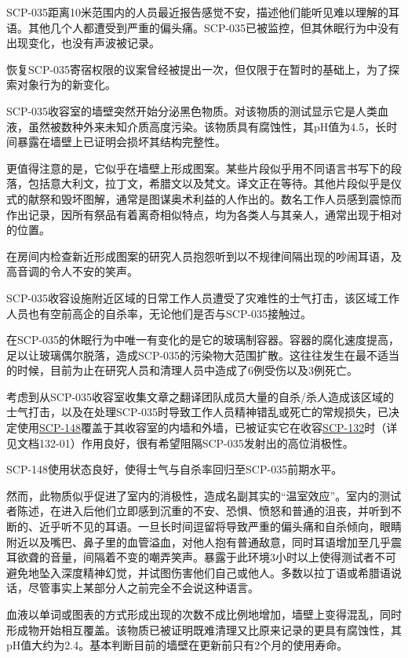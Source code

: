 SCP-035距离10米范围内的人员最近报告感觉不安，描述他们能听见难以理解的耳语。其他几个人都遭受到严重的偏头痛。SCP-035已被监控，但其休眠行为中没有出现变化，也没有声波被记录。

恢复SCP-035寄宿权限的议案曾经被提出一次，但仅限于在暂时的基础上，为了探索对象行为的新变化。

SCP-035收容室的墙壁突然开始分泌黑色物质。对该物质的测试显示它是人类血液，虽然被数种外来未知介质高度污染。该物质具有腐蚀性，其pH值为4.5，长时间暴露在墙壁上已证明会损坏其结构完整性。

更值得注意的是，它似乎在墙壁上形成图案。某些片段似乎用不同语言书写下的段落，包括意大利文，拉丁文，希腊文以及梵文。译文正在等待。其他片段似乎是仪式的献祭和毁坏图解，通常是图谋奥术利益的人作出的。数名工作人员感到震惊而作出记录，因所有祭品有着离奇相似特点，均为各类人与其亲人，通常出现于相对的位置。

在房间内检查新近形成图案的研究人员抱怨听到以不规律间隔出现的吵闹耳语，及高音调的令人不安的笑声。

SCP-035收容设施附近区域的日常工作人员遭受了灾难性的士气打击，该区域工作人员也有空前高企的自杀率，无论他们是否与SCP-035接触过。

在SCP-035的休眠行为中唯一有变化的是它的玻璃制容器。容器的腐化速度提高，足以让玻璃偶尔脱落，造成SCP-035的污染物大范围扩散。这往往发生在最不适当的时候，目前为止在研究人员和清理人员中造成了6例受伤以及3例死亡。

考虑到从SCP-035收容室收集文章之翻译团队成员大量的自杀\slash 杀人造成该区域的士气打击，以及在处理SCP-035时导致工作人员精神错乱或死亡的常规损失，已决定使用\hyperref[chap:SCP-148]{SCP-148}覆盖于其收容室的内墙和外墙，已被证实它在收容\hyperref[chap:SCP-132]{SCP-132}时（详见文档132-01）作用良好，很有希望阻隔SCP-035发射出的高位消极性。

SCP-148使用状态良好，使得士气与自杀率回归至SCP-035前期水平。

然而，此物质似乎促进了室内的消极性，造成名副其实的“温室效应”。室内的测试者陈述，在进入后他们立即感到沉重的不安、恐惧、愤怒和普通的沮丧，并听到不断的、近乎听不见的耳语。一旦长时间逗留将导致严重的偏头痛和自杀倾向，眼睛附近以及嘴巴、鼻子里的血管溢血，对他人抱有普通敌意，同时耳语增加至几乎震耳欲聋的音量，间隔着不变的嘲弄笑声。暴露于此环境3小时以上使得测试者不可避免地坠入深度精神幻觉，并试图伤害他们自己或他人。多数以拉丁语或希腊语说话，尽管事实上某部分人之前完全不会说这种语言。

血液以单词或图表的方式形成出现的次数不成比例地增加，墙壁上变得混乱，同时形成物开始相互覆盖。该物质已被证明既难清理又比原来记录的更具有腐蚀性，其pH值大约为2.4。基本判断目前的墙壁在更新前只有2个月的使用寿命。

